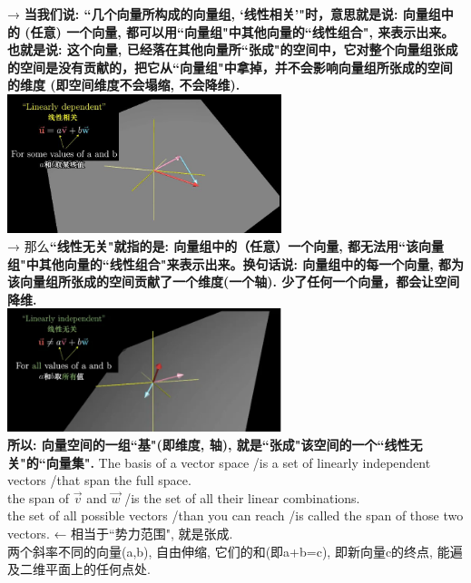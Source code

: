 \documentclass[UTF8]{ctexart}
\begin{document}
→ \textbf{当我们说: ``几个向量所构成的向量组, `线性相关'"时，意思就是说: 向量组中的 (任意) 一个向量, 都可以用``向量组"中其他向量的``线性组合", 来表示出来。也就是说: 这个向量, 已经落在其他向量所``张成"的空间中，它对整个向量组张成的空间是没有贡献的，把它从``向量组"中拿掉，并不会影响向量组所张成的空间的维度 (即空间维度不会塌缩, 不会降维). \\}
\includegraphics[width=0.6\textwidth]{img/0107.png}\\

→ 那么\textbf{``线性无关"就指的是: 向量组中的（任意）一个向量, 都无法用``该向量组"中其他向量的``线性组合"来表示出来。换句话说: 向量组中的每一个向量, 都为该向量组所张成的空间贡献了一个维度(一个轴). 少了任何一个向量，都会让空间降维.}\\
\includegraphics[width=0.6\textwidth]{img/0108.png}\\


\textbf{所以: 向量空间的一组``基"(即维度, 轴), 就是``张成"该空间的一个``线性无关"的``向量集".} The basis of a vector space /is a set of linearly independent vectors /that span the full space. \\





the span of $\vec{v}$ and $\vec{w} $  /is the set of  all their linear combinations.\\
the set of all possible vectors /than you can reach /is called the span of those two vectors. ← 相当于``势力范围", 就是张成.\\


两个斜率不同的向量(a,b), 自由伸缩, 它们的和(即a+b=c), 即新向量c的终点, 能遍及二维平面上的任何点处.\\
\end{document}
